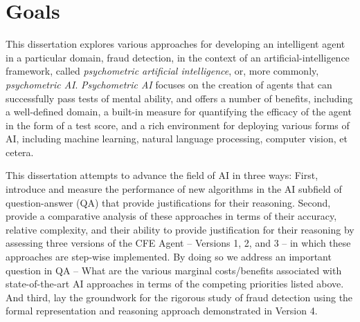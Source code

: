 \section{Goals}

This dissertation explores various approaches for developing an intelligent agent in a particular domain, fraud detection, in the context of an artificial-intelligence framework, called \textit{psychometric artificial intelligence}, or, more commonly, \textit{psychometric AI}.  \textit{Psychometric AI} focuses on the creation of agents that can successfully pass tests of mental ability, and offers a number of benefits, including a well-defined domain, a built-in measure for quantifying the efficacy of the agent in the form of a test score, and a rich environment for deploying various forms of AI, including machine learning, natural language processing, computer vision, et cetera.

This dissertation attempts to advance the field of AI in three ways:  First, introduce and measure the performance of new algorithms in the AI subfield of question-answer (QA) that provide justifications for their reasoning.  Second,  provide a comparative analysis of these approaches in terms of their accuracy, relative complexity, and their ability to provide justification for their reasoning by assessing three versions of the CFE Agent -- Versions 1, 2, and 3 -- in which these approaches are step-wise implemented.  By doing so we address an important question in QA -- What are the various marginal costs/benefits associated with state-of-the-art AI approaches in terms of the competing priorities listed above. And third, lay the groundwork for the rigorous study of fraud detection using the formal representation and reasoning approach demonstrated in Version 4.  



